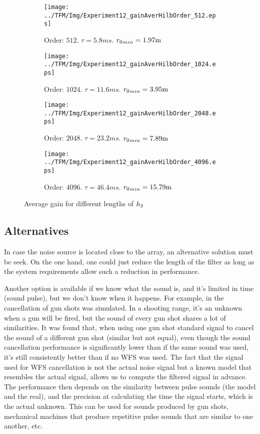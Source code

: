 \begin{figure}[h]
	\centering
	\begin{subfigure}[b]{0.45\textwidth}
		\centering
		\texttt{[image: ../TFM/Img/Experiment12\_gainAverHilbOrder\_512.eps]}
		\caption{Order: $512$. $\tau = 5.8 \si{ms}$. ${\distLinePrimSource}_{min} = 1.97\si{m}$}
	\end{subfigure}
	\begin{subfigure}[b]{0.45\textwidth}
		\centering
		\texttt{[image: ../TFM/Img/Experiment12\_gainAverHilbOrder\_1024.eps]}
		\caption{Order: $1024$. $\tau = 11.6 \si{ms}$. ${\distLinePrimSource}_{min} = 3.95\si{m}$}
	\end{subfigure}
	\begin{subfigure}[b]{0.45\textwidth}
		\centering
		\texttt{[image: ../TFM/Img/Experiment12\_gainAverHilbOrder\_2048.eps]}
		\caption{Order: $2048$. $\tau = 23.2 \si{ms}$. ${\distLinePrimSource}_{min} = 7.89\si{m}$}
	\end{subfigure}
	\begin{subfigure}[b]{0.45\textwidth}
		\centering
		\texttt{[image: ../TFM/Img/Experiment12\_gainAverHilbOrder\_4096.eps]}
		\caption{Order: $4096$. $\tau = 46.4 \si{ms}$. ${\distLinePrimSource}_{min} = 15.79\si{m}$}
	\end{subfigure}
	
	\caption{Average gain for different lengths of $\freqFilter[time][phase]$}
	\label{gainAverDifHilFilterLength}
\end{figure}

\subsection{Alternatives}
In case the noise source is located close to the array, an alternative solution must be seek. On the one hand, one could just reduce the length of the filter as long as the system requirements allow such a reduction in performance.

Another option is available if we know what the sound is, and it's limited in time (sound pulse), but we don't know when it happens. For example, in \cite{Lapini2016} the cancellation of gun shots was simulated. In a shooting range, it's an unknown when a gun will be fired, but the sound of every gun shot shares a lot of similarities. It was found that, when using one gun shot standard signal to cancel the sound of a different gun shot (similar but not equal), even though the sound cancellation performance is significantly lower than if the same sound was used, it's still consistently better than if no WFS was used. The fact that the signal used for WFS cancellation is not the actual noise signal but a known model that resembles the actual signal, allows us to compute the filtered signal in advance. The performance then depends on the similarity between pulse sounds (the model and the real), and the precision at calculating the time the signal starts, which is the actual unknown. This can be used for sounds produced by gun shots, mechanical machines that produce repetitive pulse sounds that are similar to one another, etc.

